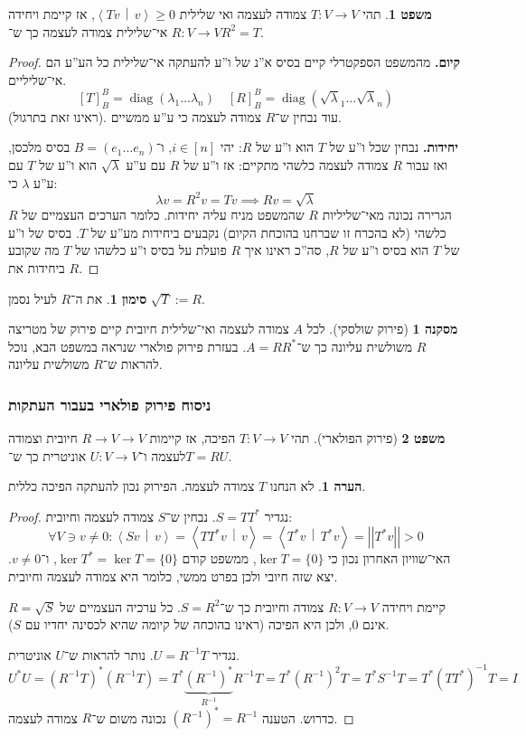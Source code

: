 \documentclass[a4paper]{article}
\newcommand\ra    {\rangle}
\newcommand\la    {\langle}
\DeclareMathOperator{\diag}    {diag}
\newcommand\co        {\colon}
\newcommand\norm[1]   {\left \vert \left \vert #1 \right \vert \right \vert}
\newcommand\mut [2]   {\left \la #1 \,\middle\vert\, #2 \right \ra}
\renewcommand\lg      {\lambda}
\newcommand\op    {^{-1}}
\theoremstyle{definition}
\newtheorem{Theorem}{\color{myblue}משפט}
\newtheorem{Remark}{\color{mycyan}הערה}
\newtheorem{Notion}{\color{myred}סימון}
\newtheorem{Collary}{\color{mymagenta}מסקנה}
\newcommand\theo  [1] {\begin{Theorem}#1\end{Theorem}}
\newcommand\rmark [1] {\begin{Remark}#1\end{Remark}}
\newcommand\noti  [1] {\begin{Notion}#1\end{Notion}}
\begin{document}
	\theo{תהי $T \co V \to V$ צמודה לעצמה ואי שלילית $\mut{Tv}{v} \ge 0$, אז קיימת ויחידה $R \co V \to V$ אי־שלילית צמודה לעצמה כך ש־$R^2 = T$. }
	
	\begin{proof}
		\textbf{קיום. }
		מהמשפט הספקטרלי קיים בסיס א''נ של ו''ע להעתקה אי־שלילית כל הע''ע הם אי־שליליים. 
		\[ [T]^{B}_B = \diag(\lg_1 \dots \lg_n) \quad [R]_B^B = \diag(\sqrt \lg_1 \dots \sqrt \lg_n) \]
		(ראינו זאת בתרגול). עוד נבחין ש־$R$ צמודה לעצמה כי ע''ע ממשיים. 
		
		\textbf{יחידות. }נבחין שכל ו''ע של $T$ הוא ו''ע של $R$: יהי $i \in [n]$, ו־$B = (e_1 \dots e_n)$ בסיס מלכסן, ואז עבור $R$ צמודה לעצמה כלשהי מתקיים: אז ו''ע של $R$ עם ע''ע $\sqrt \lg$ הוא ו''ע של $T$ עם ע''ע $\lg$ כי: 
		\[ \lg v = R^2v = Tv \implies Rv = \sqrt \lg \]
		הגרירה נכונה מאי־שליליות $R$ שהמשפט מניח עליה יחידות. כלומר הערכים העצמיים של $R$ כלשהי (לא בהכרח זו שברחנו בהוכחת הקיום) נקבעים ביחידות מע''ע של $T$. בסיס של ו''ע של $T$ הוא בסיס ו''ע של $R$, סה''כ ראינו איך $R$ פועלת על בסיס ו''ע כלשהו של $T$ מה שקובע ביחידות את $R$. 
	\end{proof}
	
	\noti{את ה־$R$ לעיל נסמן $\sqrt{T} := R$. }
	
	\begin{Collary}[פירוק שולסקי]
		לכל $A$ צמודה לעצמה ואי־שלילית חיובית קיים פירוק של מטריצה $R$ משולשית עליונה כך ש־$A=RR^*$. בעזרת פירוק פולארי שנראה במשפט הבא, נוכל להראות ש־$R$ משולשית עליונה. 
	\end{Collary}
	
	\subsubsection{ניסוח פירוק פולארי בעבור העתקות}
	\begin{Theorem}[פירוק הפולארי]
		תהי $T \co V \to V$ הפיכה, אז קיימות $R \to V \to V$ חיובית וצמודה לעצמה ו־$U \co V \to V$ אוניטרית כך ש־$T = RU$. 
	\end{Theorem}
	\rmark{לא הנחנו $T$ צמודה לעצמה. הפירוק נכון להעתקה הפיכה כללית. }
	\begin{proof}
		נגדיר $S = TT^*$. נבחין ש־$S$ צמודה לעצמה וחיובית: 
		\[ \forall V \ni v \neq 0 \co \mut{Sv}{v} = \mut{TT^* v}{v} = \mut{T^* v}{T^*v} = \norm{T^*v} > 0 \]
		האי־שוויון האחרון נכון כי $\ker T = \{0\}$, ממשפט קודם $\ker T^* = \ker T = \{0\}$, ו־$v \neq 0$. יצא שזה חיובי ולכן בפרט ממשי, כלומר היא צמודה לעצמה וחיובית. 
		
		קיימת ויחידה $R \co V \to V$ צמודה וחיובית כך ש־$S = R^2$. כל ערכיה העצמיים של $R = \sqrt S$ אינם $0$, ולכן היא הפיכה (ראינו בהוכחה של קיומה שהיא לכסינה יחדיו עם $S$). 
		
		נגדיר $U = R\op T$. נותר להראות ש־$U$ אוניטרית. 
		\[ U^*U = (R\op T)^*(R\op T) = T^*\underbrace{(R\op)^*}_{R\op}R\op T = T^*(R\op)^2 T = T^*S\op T = T^*(TT^*)\op T = I \]
		כדרוש. הטענה $(R\op)^* = R\op$ נכונה משום ש־$R$ צמודה לעצמה. 
	\end{proof}
	
\end{document}
